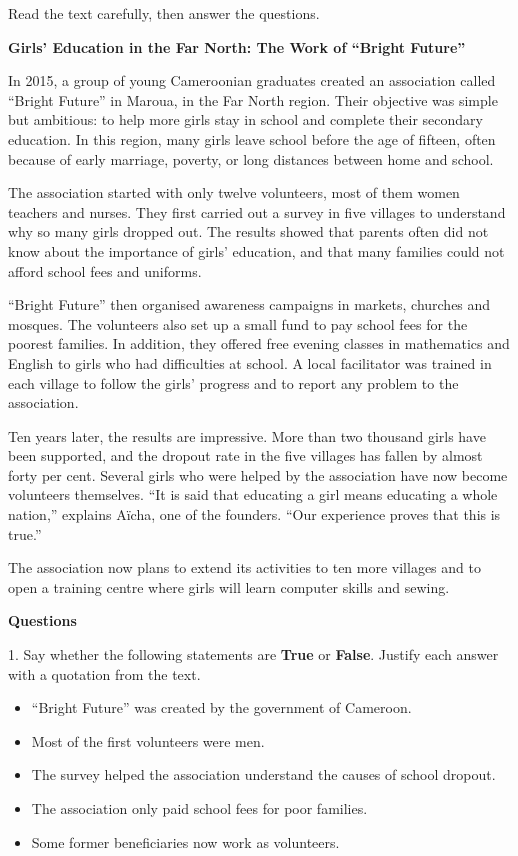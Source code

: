 \documentclass[11pt]{article}
\newcounter{popsec}
\newcounter{popsub}
\newcommand{\courssub}[1]{%
  \stepcounter{popsub}%
  \par\vspace{9pt}\noindent{\popxbold\fontsize{11.5}{13}\selectfont\color{popink}{\color{poporange}\thepopsec.\thepopsub}\hspace{6pt}#1}\par\nopagebreak\vspace{4pt}
}
\begin{document}
\courssub{Je me prépare au Bac}

\begin{exercice}
Read the text carefully, then answer the questions.

\textbf{Girls' Education in the Far North: The Work of ``Bright Future''}

In 2015, a group of young Cameroonian graduates created an association called ``Bright Future'' in Maroua, in the Far North region. Their objective was simple but ambitious: to help more girls stay in school and complete their secondary education. In this region, many girls leave school before the age of fifteen, often because of early marriage, poverty, or long distances between home and school.

The association started with only twelve volunteers, most of them women teachers and nurses. They first carried out a survey in five villages to understand why so many girls dropped out. The results showed that parents often did not know about the importance of girls' education, and that many families could not afford school fees and uniforms.

``Bright Future'' then organised awareness campaigns in markets, churches and mosques. The volunteers also set up a small fund to pay school fees for the poorest families. In addition, they offered free evening classes in mathematics and English to girls who had difficulties at school. A local facilitator was trained in each village to follow the girls' progress and to report any problem to the association.

Ten years later, the results are impressive. More than two thousand girls have been supported, and the dropout rate in the five villages has fallen by almost forty per cent. Several girls who were helped by the association have now become volunteers themselves. ``It is said that educating a girl means educating a whole nation,'' explains Aïcha, one of the founders. ``Our experience proves that this is true.''

The association now plans to extend its activities to ten more villages and to open a training centre where girls will learn computer skills and sewing.

\textbf{Questions}

1. Say whether the following statements are \textbf{True} or \textbf{False}. Justify each answer with a quotation from the text.
\begin{itemize}
\item[a.] ``Bright Future'' was created by the government of Cameroon.
\item[b.] Most of the first volunteers were men.
\item[c.] The survey helped the association understand the causes of school dropout.
\item[d.] The association only paid school fees for poor families.
\item[e.] Some former beneficiaries now work as volunteers.
\end{itemize}


\end{exercice}
\end{document}
